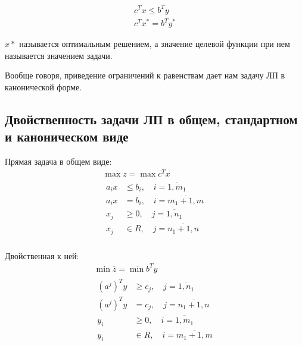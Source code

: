\documentclass[a4paper,article,14pt]{extarticle}
\begin{document}
\begin{equation}
    \begin{gathered}
        c^T x \le b^T y \\
        c^T x^* = b^T y^*
    \end{gathered}
\end{equation}

\(x*\) называется оптимальным решением, а значение целевой функции при нем называется значением задачи.

Вообще говоря, приведение ограничений к равенствам дает нам задачу ЛП в канонической форме.

\subsection{Двойственность задачи ЛП в общем, стандартном и каноническом виде}

Прямая задача в общем виде:
\begin{equation}
    \begin{gathered}
        \max z = \max c^T x \\
        \begin{aligned}
            a_ix & \le b_i, \quad i = \overline{1, m_1} \\
            a_ix & = b_i, \quad i = \overline{m_1 + 1, m} \\
            x_j & \ge 0, \quad j = \overline{1, n_1} \\
            x_j & \in R, \quad j = \overline{n_1 + 1, n} \\
        \end{aligned}
    \end{gathered}
\end{equation}

Двойственная к ней:
\begin{equation}
    \begin{gathered}
    \min \overline z = \min b^T y \\
        \begin{aligned}
            (a^j)^Ty & \ge c_j, \quad j = \overline{1, n_1} \\
            (a^j)^Ty & = c_j, \quad j = \overline{n_1 + 1, n} \\
            y_i & \ge 0, \quad i = \overline{1, m_1} \\
            y_i & \in R, \quad i = \overline{m_1 + 1, m} \\
        \end{aligned}
    \end{gathered}
\end{equation}
\end{document}
